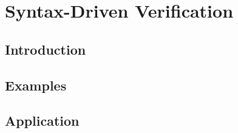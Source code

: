 \chapter{Syntax-Driven Verification} %
\section{Introduction}
\section{Examples}
\section{Application}
